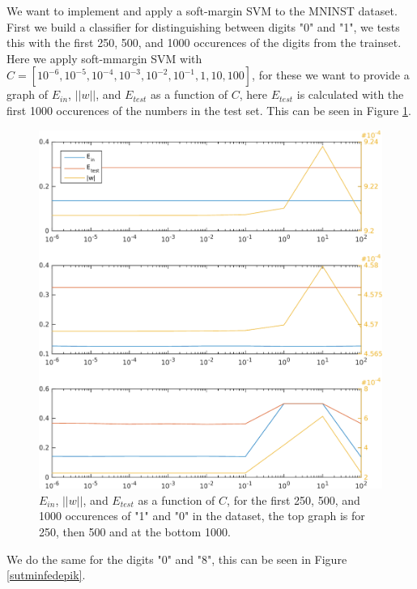 We want to implement and apply a soft-margin SVM to the MNINST dataset.\\

First we build a classifier for distinguishing between digits "0" and "1", we tests this with the first 250, 500, and 1000 occurences of the digits from the trainset. Here we apply soft-mmargin SVM with $C= [10^{-6},10^{-5},10^{-4},10^{-3},10^{-2},10^{-1},1,10,100]$, for these we want to provide a graph of $E_{in}$, $||w||$, and $E_{test}$ as a function of $C$, here $E_{test}$ is calculated with the first 1000 occurences of the numbers in the test set. This can be seen in Figure \ref{jegerhomo}.
\begin{figure}
  \centering
  \includegraphics[width=\textwidth]{./01.pdf}
  \caption{$E_{in}$, $||w||$, and $E_{test}$ as a function of $C$, for the first 250, 500, and 1000 occurences of "1" and "0" in the dataset, the top graph is for 250, then 500 and at the bottom 1000.}
  \label{jegerhomo}
\end{figure}
\noindent We do the same for the digits "0" and "8", this can be seen in Figure \ref{sutminfedepik}.
